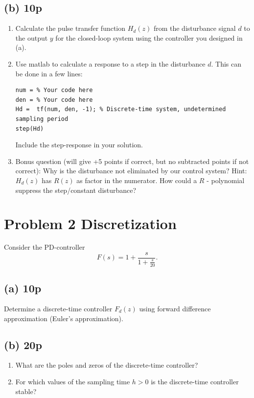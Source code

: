 \documentclass{scrartcl}
\begin{document}
\subsection*{(b) 10p}
\label{sec:orgheadline3}
\begin{enumerate}
\item Calculate the pulse transfer function \(H_d(z)\) from the disturbance signal \(d\) to the output \(y\) for the closed-loop system using the controller you designed in (a).
\item Use matlab to calculate a response to a step in the disturbance \(d\). This can be done in a few lines:
\begin{verbatim}
num = % Your code here
den = % Your code here
Hd =  tf(num, den, -1); % Discrete-time system, undetermined sampling period
step(Hd)
\end{verbatim}
Include the step-response in your solution.
\item Bonus question (will give +5 points if correct, but no subtracted points if not correct): Why is the disturbance not eliminated by our control system? Hint: \(H_d(z)\) has \(R(z)\) as factor in the numerator. How could a \(R\) - polynomial suppress the step/constant disturbance?
\end{enumerate}

\section*{Problem 2 Discretization}
\label{sec:orgheadline7}
Consider the PD-controller
\begin{equation}
F(s) = 1 + \frac{s}{1 + \frac{s}{20}}.
\label{eq:pd}
\end{equation}

\subsection*{(a) 10p}
\label{sec:orgheadline5}
Determine a discrete-time controller \(F_d(z)\) using forward difference approximation (Euler's approximation).

\subsection*{(b) 20p}
\label{sec:orgheadline6}
\begin{enumerate}
\item What are the poles and zeros of the discrete-time controller?
\item For which values of the sampling time \(h>0\) is the discrete-time controller stable?
\end{enumerate}
\end{document}

